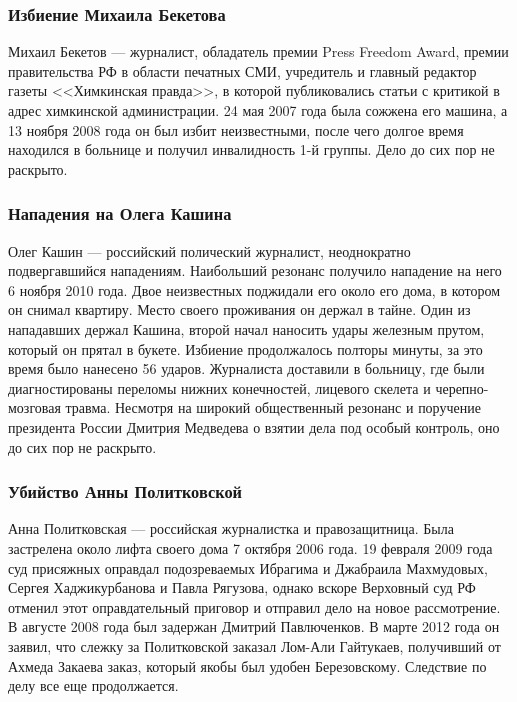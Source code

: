 \subsubsection{Избиение Михаила Бекетова}
Михаил Бекетов --- журналист, обладатель премии Press Freedom Award\cite{beketov_award}, премии правительства РФ в области печатных СМИ\cite{beketov_gosaward}, учредитель и главный редактор газеты <<Химкинская правда>>, в которой публиковались статьи с критикой в адрес химкинской администрации. 24 мая 2007 года была сожжена его машина\cite{beketov_car}, а 13 ноября 2008 года он был избит неизвестными\cite{beketov_beat}, после чего долгое время находился в больнице и получил инвалидность 1-й группы\cite{beketov_invalid}. Дело до сих пор не раскрыто.
\subsubsection{Нападения на Олега Кашина}
Олег Кашин --- российский полический журналист, неоднократно подвергавшийся нападениям. Наибольший резонанс получило нападение на него 6 ноября 2010 года. Двое неизвестных поджидали его около его дома, в котором он снимал квартиру. Место своего проживания он держал в тайне. Один из нападавших держал Кашина, второй начал наносить удары железным прутом, который он прятал в букете\cite{kashin_beat}. Избиение продолжалось полторы минуты, за это время было нанесено 56 ударов\cite{kashin_count}. Журналиста доставили в больницу, где были диагностированы переломы нижних конечностей, лицевого скелета и черепно-мозговая травма\cite{kashin_trauma}. Несмотря на широкий общественный резонанс и поручение президента России Дмитрия Медведева о взятии дела под особый контроль\cite{kashin_medvedev}, оно до сих пор не раскрыто.
\subsubsection{Убийство Анны Политковской}
Анна Политковская --- российская журналистка и правозащитница. Была застрелена около лифта своего дома 7 октября 2006 года\cite{politkovskaya_death}. 19 февраля 2009 года суд присяжных оправдал подозреваемых Ибрагима и Джабраила Махмудовых, Сергея Хаджикурбанова и Павла Рягузова\cite{politkovskaya_court1}, однако вскоре Верховный суд РФ отменил этот оправдательный приговор и отправил дело на новое рассмотрение\cite{politkovskaya_court2,politkovskaya_court3}. В августе 2008 года был задержан Дмитрий Павлюченков\cite{politkovskaya_pavluchenkov}. В марте 2012 года он заявил, что слежку за Политковской заказал Лом-Али Гайтукаев, получивший от Ахмеда Закаева заказ, который якобы был удобен Березовскому\cite{politkovskaya_head}. Следствие по делу все еще продолжается.
